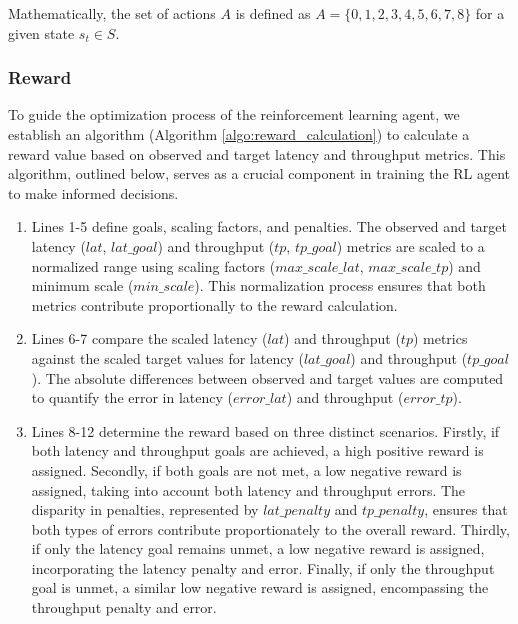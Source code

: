   Mathematically, the set of actions $A$ is defined as $A = \{0,1,2,3,4,5,6,7,8\}$ for a given state $s_t \in S$.

\subsubsection{Reward}

To guide the optimization process of the reinforcement learning agent, we establish an algorithm (Algorithm \ref{algo:reward_calculation}) to calculate a reward value based on observed and target latency and throughput metrics. This algorithm, outlined below, serves as a crucial component in training the RL agent to make informed decisions.

\begin{enumerate}
  \item Lines 1-5 define goals, scaling factors, and penalties. The observed and target latency ($lat$, $lat\_goal$) and throughput ($tp$, $tp\_goal$) metrics are scaled to a normalized range using scaling factors ($max\_scale\_lat$, $max\_scale\_tp$) and minimum scale ($min\_scale$). This normalization process ensures that both metrics contribute proportionally to the reward calculation.
  \item Lines 6-7 compare the scaled latency ($lat$) and throughput ($tp$) metrics against the scaled target values for latency ($lat\_goal$) and throughput ($tp\_goal$). The absolute differences between observed and target values are computed to quantify the error in latency ($error\_lat$) and throughput ($error\_tp$).
  \item Lines 8-12 determine the reward based on three distinct scenarios. Firstly, if both latency and throughput goals are achieved, a high positive reward is assigned. Secondly, if both goals are not met, a low negative reward is assigned, taking into account both latency and throughput errors. The disparity in penalties, represented by $lat\_penalty$ and $tp\_penalty$, ensures that both types of errors contribute proportionately to the overall reward. Thirdly, if only the latency goal remains unmet, a low negative reward is assigned, incorporating the latency penalty and error. Finally, if only the throughput goal is unmet, a similar low negative reward is assigned, encompassing the throughput penalty and error.
\end{enumerate}

